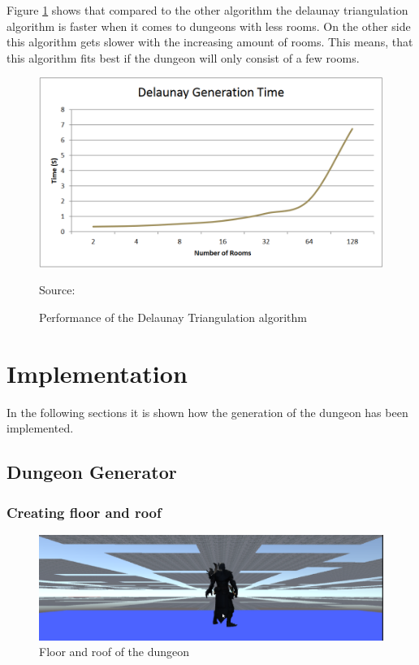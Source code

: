 \documentclass[a4paper,11pt,oneside]{scrreprt}
\begin{document}
\newpage
Figure \ref{fig:delaunay_performance} shows that compared to the other algorithm the delaunay triangulation algorithm is faster when it comes to dungeons with less rooms. On the other side this algorithm gets slower with the increasing amount of rooms. This means, that this algorithm fits best if the dungeon will only consist of a few rooms.
\begin{figure}[ht]
	\centering
	\includegraphics[scale=0.6]{images/delaunay_performance.png} 
	\caption{Performance of the Delaunay Triangulation algorithm}
	Source: \cite[][]{williams_investigation_nodate}
	\label{fig:delaunay_performance}
\end{figure}

\chapter{Implementation}
\label{chapter:implementation}
In the following sections it is shown how the generation of the dungeon has been implemented.
\section{Dungeon Generator}
\label{section:dungeon-generator}

\subsection{Creating floor and roof}
\label{subsection:creating-floor-and-roof}
\begin{figure}[ht]
	\centering
	\includegraphics[scale=0.5]{images/dungeon_floor_and_roof.png}  
	\caption{Floor and roof of the dungeon}
	\label{fig:floor-roof}
\end{figure}
\end{document}
